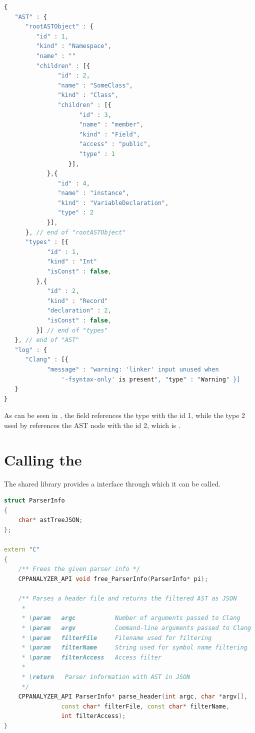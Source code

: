 \SingleSpacing
\begin{lstlisting}[language=JavaScript, caption=AST converted to \myProperName{JSON} (reduced example), label=listing:JSON]
{
   "AST" : {
      "rootASTObject" : {
         "id" : 1,
         "kind" : "Namespace",
         "name" : ""
         "children" : [{
               "id" : 2,
               "name" : "SomeClass",
               "kind" : "Class",
               "children" : [{
                     "id" : 3,
                     "name" : "member",
                     "kind" : "Field",
                     "access" : "public",
                     "type" : 1
                  }],
            },{
               "id" : 4,
               "name" : "instance",
               "kind" : "VariableDeclaration",
               "type" : 2
            }],
      }, // end of "rootASTObject"
      "types" : [{
            "id" : 1,
            "kind" : "Int"
            "isConst" : false,
         },{
            "id" : 2,
            "kind" : "Record"		 
            "declaration" : 2,
            "isConst" : false,
         }] // end of "types"
   }, // end of "AST"
   "log" : {
      "Clang" : [{
            "message" : "warning: 'linker' input unused when 
                '-fsyntax-only' is present", "type" : "Warning" }]
   }
}
\end{lstlisting}
\OnehalfSpacing

As can be seen in , the field  references the type with the id 1, while the type 2 used by  references the AST node with the id 2, which is .

\newpage
\section{Calling the }
\label{sec:CallingCPPAnalyzer}

The  shared library provides a  interface through which it can be called.

\SingleSpacing
\begin{lstlisting}[language=C++, caption=\myProperName{CPPAnalyzer} \myProperName{C} API]
struct ParserInfo
{
	char* astTreeJSON;
};

extern "C"
{
	/** Frees the given parser info */
	CPPANALYZER_API void free_ParserInfo(ParserInfo* pi);

	/** Parses a header file and returns the filtered AST as JSON
	 *
	 * \param   argc           Number of arguments passed to Clang
	 * \param   argv           Command-line arguments passed to Clang
	 * \param   filterFile     Filename used for filtering
	 * \param   filterName     String used for symbol name filtering
	 * \param   filterAccess   Access filter
	 *
	 * \return   Parser information with AST in JSON
	 */
	CPPANALYZER_API ParserInfo* parse_header(int argc, char *argv[], 
				const char* filterFile, const char* filterName, 
				int filterAccess);
}
\end{lstlisting}
\OnehalfSpacing

